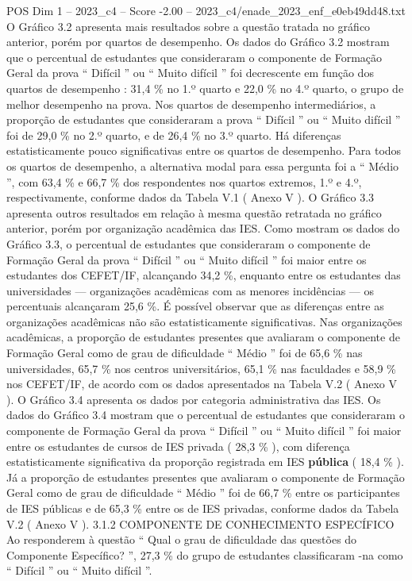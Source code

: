 \begin{textsample}{POS Dim 1 – 2023\_c4 – Score -2.00 – 2023\_c4/enade\_2023\_enf\_e0eb49dd48.txt}
O Gráfico 3.2 apresenta mais resultados sobre a questão tratada no gráfico anterior, porém por quartos de desempenho.
Os dados do Gráfico 3.2 mostram que o percentual de estudantes que consideraram o componente de Formação Geral da prova “ Difícil ” ou “ Muito difícil ” foi decrescente em função dos quartos de desempenho : 31,4 \% no 1.º quarto e 22,0 \% no 4.º quarto, o grupo de melhor desempenho na prova.
Nos quartos de desempenho intermediários, a proporção de estudantes que consideraram a prova “ Difícil ” ou “ Muito difícil ” foi de 29,0 \% no 2.º quarto, e de 26,4 \% no 3.º quarto.
Há diferenças estatisticamente pouco significativas entre os quartos de desempenho.
Para todos os quartos de desempenho, a alternativa modal para essa pergunta foi a “ Médio ”, com 63,4 \% e 66,7 \% dos respondentes nos quartos extremos, 1.º e 4.º, respectivamente, conforme dados da Tabela V.1 ( Anexo V ).
O Gráfico 3.3 apresenta outros resultados em relação à mesma questão retratada no gráfico anterior, porém por organização acadêmica das IES.
Como mostram os dados do Gráfico 3.3, o percentual de estudantes que consideraram o componente de Formação Geral da prova “ Difícil ” ou “ Muito difícil ” foi maior entre os estudantes dos CEFET/IF, alcançando 34,2 \%, enquanto entre os estudantes das universidades — organizações acadêmicas com as menores incidências — os percentuais alcançaram 25,6 \%.
É possível observar que as diferenças entre as organizações acadêmicas não são estatisticamente significativas.
Nas organizações acadêmicas, a proporção de estudantes presentes que avaliaram o componente de Formação Geral como de grau de dificuldade “ Médio ” foi de 65,6 \% nas universidades, 65,7 \% nos centros universitários, 65,1 \% nas faculdades e 58,9 \% nos CEFET/IF, de acordo com os dados apresentados na Tabela V.2 ( Anexo V ).
O Gráfico 3.4 apresenta os dados por categoria administrativa das IES.
Os dados do Gráfico 3.4 mostram que o percentual de estudantes que consideraram o componente de Formação Geral da prova “ Difícil ” ou “ Muito difícil ” foi maior entre os estudantes de cursos de IES privada ( 28,3 \% ), com diferença estatisticamente significativa da proporção registrada em IES \textbf{pública} ( 18,4 \% ).
Já a proporção de estudantes presentes que avaliaram o componente de Formação Geral como de grau de dificuldade “ Médio ” foi de 66,7 \% entre os participantes de IES públicas e de 65,3 \% entre os de IES privadas, conforme dados da Tabela V.2 ( Anexo V ). 3.1.2 COMPONENTE DE CONHECIMENTO ESPECÍFICO Ao responderem à questão “ Qual o grau de dificuldade das questões do Componente Específico? ”, 27,3 \% do grupo de estudantes classificaram -na como “ Difícil ” ou “ Muito difícil ”.

\end{textsample}
